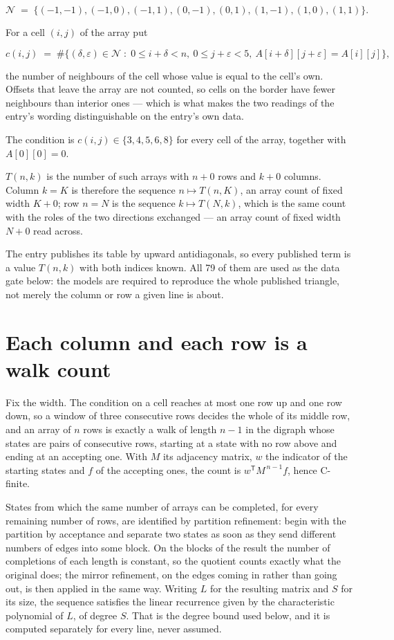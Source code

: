 \documentclass[11pt]{article}
\theoremstyle{definition}
\begin{document}
\[\mathcal{N} \;=\; \{(-1,-1), (-1,0), (-1,1), (0,-1), (0,1), (1,-1), (1,0), (1,1)\}.\]

For a cell $(i,j)$ of the array put

\[c(i,j) \;=\; \#\bigl\{(\delta,\varepsilon)\in\mathcal{N} \;:\; 0\le i+\delta<n,\ 0\le j+\varepsilon<5,\ A[i+\delta][j+\varepsilon] = A[i][j]\bigr\},\]

the number of neighbours of the cell whose value is equal to the cell's own. Offsets that leave the array are not counted, so cells on the border have fewer neighbours than interior ones --- which is what makes the two readings of the entry's wording distinguishable on the entry's own data.

The condition is $c(i,j) \in \{3, 4, 5, 6, 8\}$ for every cell of the array, together with $A[0][0]=0$.

$T(n,k)$ is the number of such arrays with $n + 0$ rows and $k + 0$ columns. Column $k = K$ is therefore the sequence $n \mapsto T(n,K)$, an array count of fixed width $K + 0$; row $n = N$ is the sequence $k \mapsto T(N,k)$, which is the same count with the roles of the two directions exchanged --- an array count of fixed width $N + 0$ read across.

The entry publishes its table by upward antidiagonals, so every published term is a value $T(n,k)$ with both indices known. All 79 of them are used as the data gate below: the models are required to reproduce the whole published triangle, not merely the column or row a given line is about.

\section{Each column and each row is a walk count}

Fix the width. The condition on a cell reaches at most one row up and one row down, so a window of three consecutive rows decides the whole of its middle row, and an array of $n$ rows is exactly a walk of length $n-1$ in the digraph whose states are pairs of consecutive rows, starting at a state with no row above and ending at an accepting one. With $M$ its adjacency matrix, $w$ the indicator of the starting states and $f$ of the accepting ones, the count is $w^{\mathsf T}M^{\,n-1}f$, hence C-finite.

States from which the same number of arrays can be completed, for every remaining number of rows, are identified by partition refinement: begin with the partition by acceptance and separate two states as soon as they send different numbers of edges into some block. On the blocks of the result the number of completions of each length is constant, so the quotient counts exactly what the original does; the mirror refinement, on the edges coming in rather than going out, is then applied in the same way. Writing $L$ for the resulting matrix and $S$ for its size, the sequence satisfies the linear recurrence given by the characteristic polynomial of $L$, of degree $S$. That is the degree bound used below, and it is computed separately for every line, never assumed.
\end{document}

